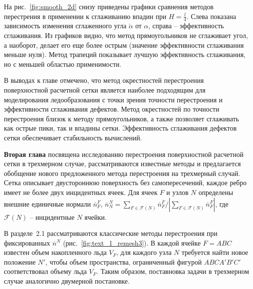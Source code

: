 \documentclass[a4paper,14pt]{extarticle}                     %
\theoremstyle{plain}                                         %
\begin{document}
На рис.~\ref{fig:smooth_2d} снизу приведены графики сравнения методов перестрения в применении к сглаживанию впадин при $H = \frac{l}{4}$.
Слева показана зависимость изменения сглаженного угла $\check{\alpha}$ от $\alpha$, справа -- эффективность сглаживания.
Из графиков видно, что метод прямоугольников не сглаживает угол, а наоборот, делает его еще более острым (значение эффективности сглаживания меньше нуля).
Метод трапеций показывает лучшую эффективность сглаживания, но с меньшей областью применимости.

В выводах к главе отмечено, что метод окрестностей перестроения поверхностной расчетной сетки является наиболее подходящим для моделирования ледообразования с точки зрения точности перестроения и эффективности сглаживания дефектов.
Метод окрестностей по точности перестроения близок к методу прямоугольников, а также позволяет сглаживать как острые пики, так и впадины сетки.
Эффективность сглаживания дефектов сетки обеспечивает стабильность вычислений.


\textbf{Вторая глава} посвящена исследованию перестроения поверхностной расчетной сетки в трехмерном случае, рассматриваются известные методы и предлагается обобщение нового предложенного метода перестроения на трехмерный случай.
Сетка описывает двустороннюю поверхность без самопересечений, каждое ребро имеет не более двух инцидентных ячеек.
Для ячеек $F$ и узлов $N$ определены внешние единичные нормали $\overline{n}_F^F$, $\overline{n}_N^N = \sum_{F \in \mathscr{F}(N)}{\overline{n}_F^F} / |\sum_{F \in \mathscr{F}(N)}{\overline{n}_F^F}|$, где $\mathscr{F}(N)$ -- инцидентные $N$ ячейки.


В разделе~2.1 рассматриваются классические методы перестроения при фиксированных $\overline{n}^N$ (рис.~\ref{fig:text_1_remesh3}).
В каждой ячейке $F = ABC$ известен объем накопленного льда $V_F$, для каждого узла $N$ требуется найти новое положение $N'$, чтобы объем пространства, ограниченный фигурой $ABCA'B'C'$ соответствовал объему льда $V_F$.
Таким образом, поставновка задачи в трехмерном случае аналогично двумерной постановке.
\end{document}
